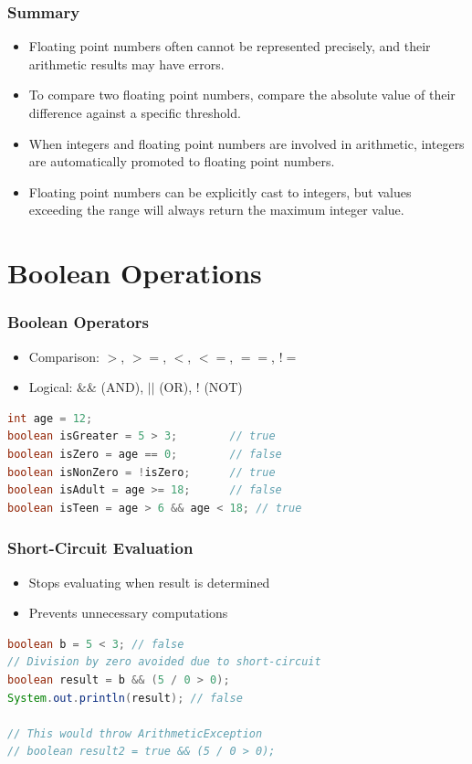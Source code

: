 \documentclass[serif, aspectratio=169]{beamer}
\begin{document}
\begin{frame}[fragile]
\frametitle{Summary}
\begin{itemize}
    \item Floating point numbers often cannot be represented precisely, and their arithmetic results may have errors.
    \item To compare two floating point numbers, compare the absolute value of their difference against a specific threshold.
    \item When integers and floating point numbers are involved in arithmetic, integers are automatically promoted to floating point numbers.
    \item Floating point numbers can be explicitly cast to integers, but values exceeding the range will always return the maximum integer value.
\end{itemize}
\end{frame}

\section{Boolean Operations}
\begin{frame}[fragile]
\frametitle{Boolean Operators}
\begin{itemize}
    \item Comparison: $>$, $>=$, $<$, $<=$, $==$, $!=$
    \item Logical: $\&\&$ (AND), $||$ (OR), $!$ (NOT)
\end{itemize}
\begin{lstlisting}[language=Java]
int age = 12;
boolean isGreater = 5 > 3;        // true
boolean isZero = age == 0;        // false
boolean isNonZero = !isZero;      // true
boolean isAdult = age >= 18;      // false
boolean isTeen = age > 6 && age < 18; // true
\end{lstlisting}
\end{frame}

\begin{frame}[fragile]
\frametitle{Short-Circuit Evaluation}
\begin{itemize}
    \item Stops evaluating when result is determined
    \item Prevents unnecessary computations
\end{itemize}
\begin{lstlisting}[language=Java]
boolean b = 5 < 3; // false
// Division by zero avoided due to short-circuit
boolean result = b && (5 / 0 > 0);
System.out.println(result); // false

// This would throw ArithmeticException
// boolean result2 = true && (5 / 0 > 0);
\end{lstlisting}
\end{frame}
\end{document}
